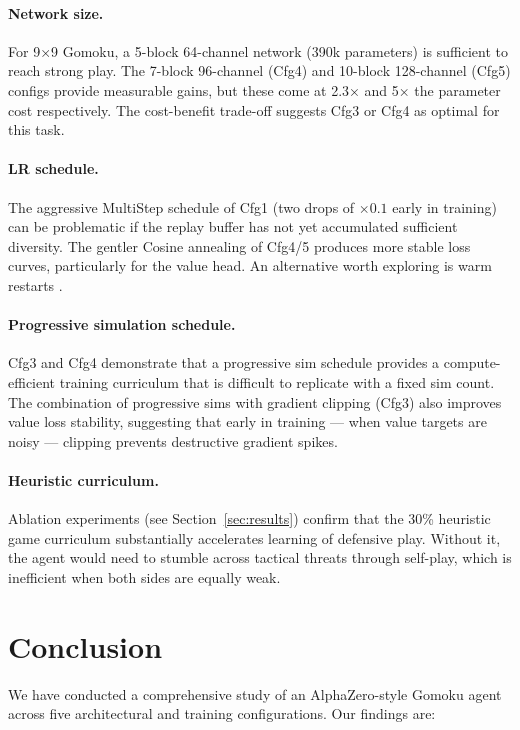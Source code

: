 \documentclass[11pt,a4paper]{article}
\begin{document}
{{\paragraph{Network size.}
For 9×9 Gomoku, a 5-block 64-channel network (390k parameters) is sufficient to
reach strong play.  The 7-block 96-channel (Cfg4) and 10-block 128-channel
(Cfg5) configs provide measurable gains, but these come at 2.3× and 5× the
parameter cost respectively.  The cost-benefit trade-off suggests Cfg3 or Cfg4
as optimal for this task.

\paragraph{LR schedule.}
The aggressive MultiStep schedule of Cfg1 (two drops of $\times0.1$ early in
training) can be problematic if the replay buffer has not yet accumulated
sufficient diversity.  The gentler Cosine annealing of Cfg4/5 produces more
stable loss curves, particularly for the value head.  An alternative worth
exploring is warm restarts \citep{loshchilov2016}.

\paragraph{Progressive simulation schedule.}
Cfg3 and Cfg4 demonstrate that a progressive sim schedule provides a
compute-efficient training curriculum that is difficult to replicate with a fixed
sim count.  The combination of progressive sims with gradient clipping (Cfg3)
also improves value loss stability, suggesting that early in training — when
value targets are noisy — clipping prevents destructive gradient spikes.

\paragraph{Heuristic curriculum.}
Ablation experiments (see Section~\ref{sec:results}) confirm that the 30\%
heuristic game curriculum substantially accelerates learning of defensive play.
Without it, the agent would need to stumble across tactical threats through
self-play, which is inefficient when both sides are equally weak.

\section{Conclusion}

We have conducted a comprehensive study of an AlphaZero-style Gomoku agent across
five architectural and training configurations.  Our findings are:

}}
\end{document}
